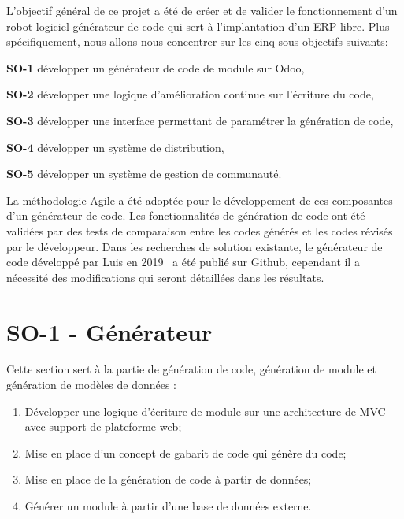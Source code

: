 \label{sec:Theme1} \label{chapitre_methode}
L’objectif général de ce projet a été de créer et de valider le fonctionnement d’un robot logiciel générateur de code qui sert à l’implantation d’un ERP libre. Plus spécifiquement, nous allons nous concentrer sur les cinq sous-objectifs suivants:

\textbf{SO-1} développer un générateur de code de module sur Odoo,

\textbf{SO-2} développer une logique d'amélioration continue sur l'écriture du code,

\textbf{SO-3} développer une interface permettant de paramétrer la génération de code,

\textbf{SO-4} développer un système de distribution,

\textbf{SO-5} développer un système de gestion de communauté.

La méthodologie Agile a été adoptée pour le développement de ces composantes d'un générateur de code. Les fonctionnalités de génération de code ont été validées par des tests de comparaison entre les codes générés et les codes révisés par le développeur. Dans les recherches de solution existante, le générateur de code développé par Luis en 2019~\cite{bluiksnot_repo} a été publié sur Github, cependant il a nécessité des modifications qui seront détaillées dans les résultats.


\section{SO-1 - Générateur}
Cette section sert à la partie de génération de code, génération de module et génération de modèles de données :
\begin{enumerate}
    \item Développer une logique d’écriture de module sur une architecture de MVC avec support de plateforme web;
    \item Mise en place d’un concept de gabarit de code qui génère du code;
    \item Mise en place de la génération de code à partir de données;
    \item Générer un module à partir d’une base de données externe.
\end{enumerate}

